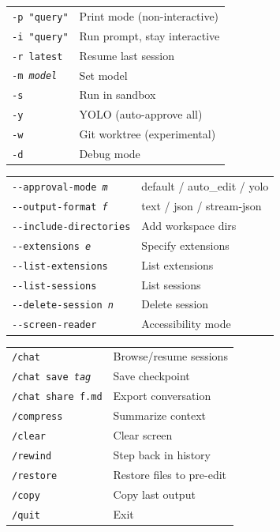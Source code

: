 \documentclass[9pt]{extarticle}
\newcommand{\sect}[1]{\needspace{4\baselineskip}\vspace{6pt}{\footnotesize\bfseries\scshape #1}\par\vspace{2pt}}
\begin{document}
\begin{multicols}{3}

\sect{CLI Flags --- Essentials}
\begin{tabularx}{\linewidth}{@{}l@{\enspace}Y@{}}
\texttt{-p "query"}                  & Print mode (non-interactive) \\
\texttt{-i "query"}                  & Run prompt, stay interactive \\
\texttt{-r latest}                   & Resume last session \\
\texttt{-m \textit{model}}          & Set model \\
\texttt{-s}                          & Run in sandbox \\
\texttt{-y}                          & YOLO (auto-approve all) \\
\texttt{-w}                          & Git worktree (experimental) \\
\texttt{-d}                          & Debug mode \\
\end{tabularx}

\sect{CLI Flags --- Advanced}
\begin{tabularx}{\linewidth}{@{}l@{\enspace}Y@{}}
\texttt{-{}-approval-mode \textit{m}}  & default / auto\_edit / yolo \\
\texttt{-{}-output-format \textit{f}}  & text / json / stream-json \\
\texttt{-{}-include-directories}     & Add workspace dirs \\
\texttt{-{}-extensions \textit{e}}   & Specify extensions \\
\texttt{-{}-list-extensions}         & List extensions \\
\texttt{-{}-list-sessions}           & List sessions \\
\texttt{-{}-delete-session \textit{n}} & Delete session \\
\texttt{-{}-screen-reader}           & Accessibility mode \\
\end{tabularx}

\sect{Slash Commands --- Session}
\begin{tabularx}{\linewidth}{@{}l@{\enspace}Y@{}}
\texttt{/chat}                       & Browse/resume sessions \\
\texttt{/chat save \textit{tag}}    & Save checkpoint \\
\texttt{/chat share f.md}           & Export conversation \\
\texttt{/compress}                   & Summarize context \\
\texttt{/clear}                      & Clear screen \\
\texttt{/rewind}                     & Step back in history \\
\texttt{/restore}                    & Restore files to pre-edit \\
\texttt{/copy}                       & Copy last output \\
\texttt{/quit}                       & Exit \\
\end{tabularx}


\end{multicols}
\end{document}
